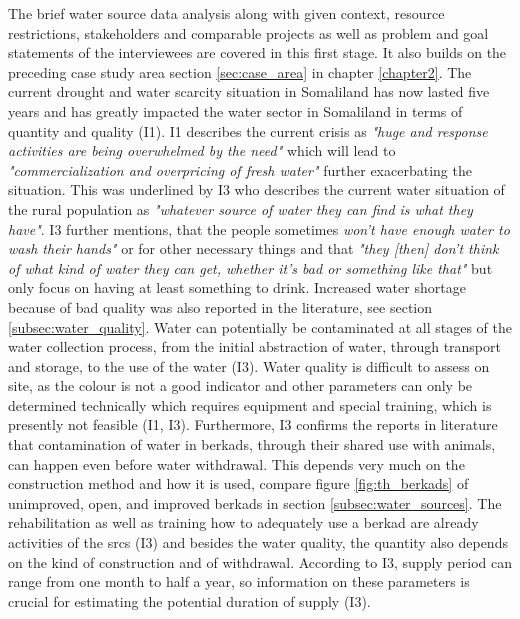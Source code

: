 The brief water source data analysis along with given context, resource restrictions, stakeholders and comparable projects as well as problem and goal statements of the interviewees are covered in this first stage. It also builds on the preceding case study area section \ref{sec:case_area} in chapter \ref{chapter2}.\newline
The current drought and water scarcity situation in Somaliland has now lasted five years and has greatly impacted the water sector in Somaliland in terms of quantity and quality (I1). I1 describes the current crisis as \textit{"huge and response activities are being overwhelmed by the need"} which will lead to \textit{"commercialization and overpricing of fresh water"} further exacerbating the situation. This was underlined by I3 who describes the current water situation of the rural population as \textit{"whatever source of water they can find is what they have"}. I3 further mentions, that the people sometimes \textit{won't have enough water to wash their hands"} or for other necessary things and that \textit{"they [then] don't think of what kind of water they can get, whether it's bad or something like that"} but only focus on having at least something to drink. Increased water shortage because of bad quality was also reported in the literature, see section \ref{subsec:water_quality}. Water can potentially be contaminated at all stages of the water collection process, from the initial abstraction of water, through transport and storage, to the use of the water (I3). Water quality is difficult to assess on site, as the colour is not a good indicator and other parameters can only be determined technically which requires equipment and special training, which is presently not feasible (I1, I3). Furthermore, I3 confirms the reports in literature that contamination of water in berkads, through their shared use with animals, can happen even before water withdrawal. This depends very much on the construction method and how it is used, compare figure \ref{fig:th_berkads} of unimproved, open, and improved berkads in section \ref{subsec:water_sources}. The rehabilitation as well as training how to adequately use a berkad are already activities of the \acrshort{srcs} (I3) and besides the water quality, the quantity also depends on the kind of construction and of withdrawal. According to I3, supply period can range from one month to half a year, so information on these parameters is crucial for estimating the potential duration of supply (I3).\newline
